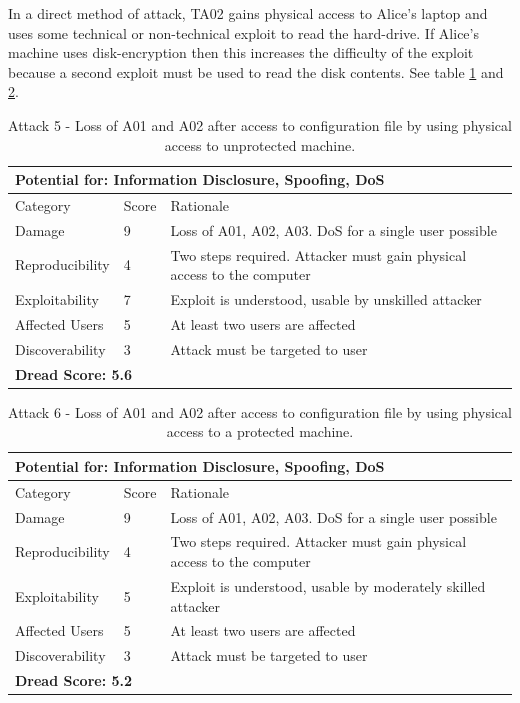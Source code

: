 \documentclass [11pt, proquest] {uwthesis}[2020/02/24]
\begin{document}
In a direct method of attack, TA02 gains physical access to Alice's laptop and uses some technical or non-technical exploit to read the hard-drive. If Alice's machine uses disk-encryption then this increases the difficulty of the exploit because a second exploit must be used to read the disk contents.
See table \ref{ref:attack5} and \ref{ref:attack6}.
\begin{table}[H]
\begin{tabular}{|m{3cm}|m{.9cm}|p{27em} |}
\multicolumn{3}{l}{Potential for: Information Disclosure, Spoofing, DoS}                   \\
\hline
Category & Score & Rationale \\
\hline
Damage          & 9     & Loss of A01, A02, A03. DoS for a single user possible            \\
\hline
Reproducibility & 4     & Two steps required. Attacker must gain physical access to the computer     \\
\hline
Exploitability & 7      & Exploit is understood, usable by unskilled attacker \\
\hline
Affected Users  & 5     & At least two users are affected                      \\
\hline
Discoverability & 3     & Attack must be targeted to user \\
\hline
\multicolumn{3}{l}{\textbf{Dread Score: 5.6}} 
\end{tabular}
\caption{Attack 5 - Loss of A01 and A02 after access to configuration file by using physical access to unprotected machine.}
\label{ref:attack5}
\end{table}

\begin{table}[H]
\begin{tabular}{|m{3cm}|m{.9cm}|p{27em} |}
\multicolumn{3}{l}{Potential for: Information Disclosure, Spoofing, DoS}                   \\
\hline
Category & Score & Rationale \\
\hline
Damage          & 9     & Loss of A01, A02, A03. DoS for a single user possible            \\
\hline
Reproducibility & 4     & Two steps required. Attacker must gain physical access to the computer     \\
\hline
Exploitability & 5      & Exploit is understood, usable by moderately skilled attacker  \\
\hline
Affected Users  & 5     & At least two users are affected                      \\
\hline
Discoverability & 3     & Attack must be targeted to user \\
\hline
\multicolumn{3}{l}{\textbf{Dread Score: 5.2}} 
\end{tabular}
\caption{Attack 6 - Loss of A01 and A02 after access to configuration file by using physical access to a protected machine.}
\label{ref:attack6}
\end{table}
\end{document}
